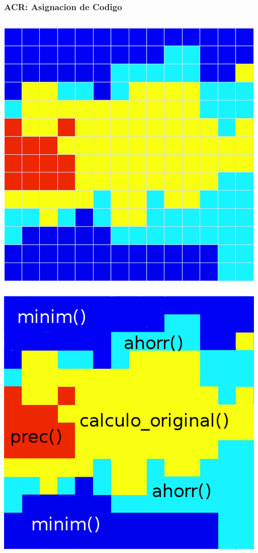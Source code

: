 \documentclass{beamer}\usetheme{Madrid} %
\begin{document}
\begin{frame}
\frametitle{ACR: Asignacion de Codigo}
\begin{columns}
\begin{center}
\includegraphics[scale=0.2]{img/asignacion_codigo.png}

\end{center}
\end{columns}
\end{frame}
\end{document}
